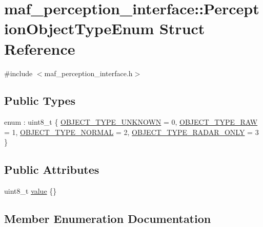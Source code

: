 \hypertarget{structmaf__perception__interface_1_1PerceptionObjectTypeEnum}{}\section{maf\+\_\+perception\+\_\+interface\+:\+:Perception\+Object\+Type\+Enum Struct Reference}
\label{structmaf__perception__interface_1_1PerceptionObjectTypeEnum}


{\ttfamily \#include $<$maf\+\_\+perception\+\_\+interface.\+h$>$}

\subsection*{Public Types}
\begin{DoxyCompactItemize}
\item 
enum \+: uint8\+\_\+t \{ \hyperlink{structmaf__perception__interface_1_1PerceptionObjectTypeEnum_a49d8d2be903c7973ced18de704aff10da68e0dcf0d818a5bea6ec1266d8a66161}{O\+B\+J\+E\+C\+T\+\_\+\+T\+Y\+P\+E\+\_\+\+U\+N\+K\+N\+O\+WN} = 0, 
\hyperlink{structmaf__perception__interface_1_1PerceptionObjectTypeEnum_a49d8d2be903c7973ced18de704aff10dae6dbd5b5b91299a0f56cae5e02f15b1e}{O\+B\+J\+E\+C\+T\+\_\+\+T\+Y\+P\+E\+\_\+\+R\+AW} = 1, 
\hyperlink{structmaf__perception__interface_1_1PerceptionObjectTypeEnum_a49d8d2be903c7973ced18de704aff10dad96bc2f7a707bb33f73dd8a4e424e6b0}{O\+B\+J\+E\+C\+T\+\_\+\+T\+Y\+P\+E\+\_\+\+N\+O\+R\+M\+AL} = 2, 
\hyperlink{structmaf__perception__interface_1_1PerceptionObjectTypeEnum_a49d8d2be903c7973ced18de704aff10daeda11815240aa6968fd99eb4669fcc3d}{O\+B\+J\+E\+C\+T\+\_\+\+T\+Y\+P\+E\+\_\+\+R\+A\+D\+A\+R\+\_\+\+O\+N\+LY} = 3
 \}
\end{DoxyCompactItemize}
\subsection*{Public Attributes}
\begin{DoxyCompactItemize}
\item 
uint8\+\_\+t \hyperlink{structmaf__perception__interface_1_1PerceptionObjectTypeEnum_ae99bdc38aac4c56faef995b22dba73e3}{value} \{\}
\end{DoxyCompactItemize}


\subsection{Member Enumeration Documentation}
\mbox{\label{structmaf__perception__interface_1_1PerceptionObjectTypeEnum_a49d8d2be903c7973ced18de704aff10d}} 
